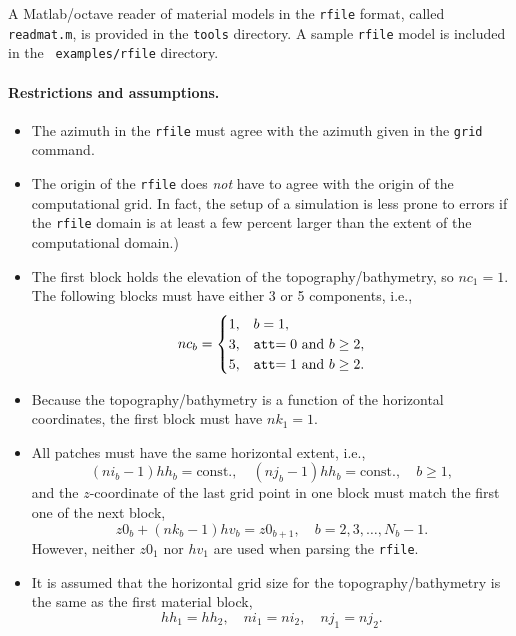 \documentclass[11pt]{report}
\begin{document}
{A Matlab/octave reader of material models in the {\tt rfile} format, called {\tt readmat.m}, is
provided in the {\tt tools} directory. A sample {\tt rfile} model is included in the {\tt
		examples/rfile} directory.

\paragraph{Restrictions and assumptions.}
\begin{itemize}
	\item The azimuth in the {\tt rfile} must agree with the azimuth given in the {\tt grid} command.
	\item The origin of the {\tt rfile} does {\em not} have to agree with the origin of the
	      computational grid. In fact, the setup of a simulation is less prone to errors if the {\tt rfile}
	      domain is at least a few percent larger than the extent of the computational domain.)

	\item The first block holds the elevation of the topography/bathymetry, so $nc_1=1$. The following blocks
	      must have either 3 or 5 components, i.e.,
	      \[
		      nc_b=\begin{cases}
			      1, & b=1,                                \\
			      3, & \mbox{{\tt att}$=0$ and $b\geq 2$}, \\
			      5, & \mbox{{\tt att}$=1$ and $b\geq 2$}.
		      \end{cases}
	      \]

	\item Because the topography/bathymetry is a function of the horizontal coordinates, the first block must have
	      $nk_1=1$.

	\item All patches must have the same horizontal extent, i.e.,
	      \[
		      (ni_b -1)hh_b = \mbox{const.},\quad (nj_b - 1)hh_b = \mbox{const.},\quad b\geq 1,
	      \]
	      and the $z$-coordinate of the last grid point in one block must match the first one of the next
	      block,
	      \[
		      z0_b+(nk_b-1)hv_b = z0_{b+1},\quad b=2,3,\ldots,N_b-1.
	      \]
	      However, neither $z0_1$ nor $hv_1$ are used when parsing the {\tt rfile}.

	\item It is assumed that the horizontal grid size for the topography/bathymetry is the same as the
	      first material block,
	      \[
		      hh_1 = hh_2,\quad ni_1=ni_2,\quad nj_1=nj_2.
	      \]
\end{itemize}

}
\end{document}
